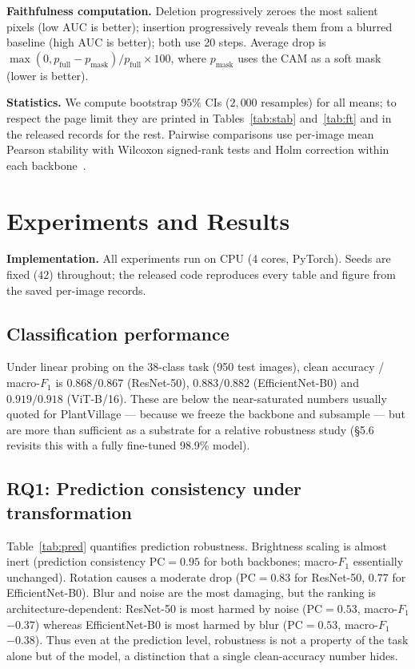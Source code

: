 \documentclass[runningheads]{llncs}
\begin{document}
\smallskip
\noindent\textbf{Faithfulness computation.} Deletion progressively zeroes the most
salient pixels (low AUC is better); insertion progressively reveals them from a
blurred baseline (high AUC is better); both use 20 steps. Average drop is
$\max(0, p_{\text{full}}-p_{\text{mask}})/p_{\text{full}}\times100$, where
$p_{\text{mask}}$ uses the CAM as a soft mask (lower is better).

\smallskip
\noindent\textbf{Statistics.} We compute bootstrap $95\%$ CIs ($2{,}000$ resamples)
for all means; to respect the page limit they are printed in Tables~\ref{tab:stab}
and~\ref{tab:ft} and in the released records for the rest. Pairwise comparisons use
per-image mean Pearson stability with Wilcoxon signed-rank tests and Holm correction
within each backbone~\cite{holm1979}.

\section{Experiments and Results}\label{sec:exp}
\noindent\textbf{Implementation.} All experiments run on CPU (4 cores, PyTorch).
Seeds are fixed ($42$) throughout; the released code reproduces every table and
figure from the saved per-image records.

\subsection{Classification performance}
Under linear probing on the 38-class task (950 test images), clean accuracy /
macro-$F_1$ is $0.868/0.867$ (ResNet-50), $0.883/0.882$ (EfficientNet-B0) and
$0.919/0.918$ (ViT-B/16). These are below the near-saturated numbers usually quoted
for PlantVillage --- because we freeze the backbone and subsample --- but are more
than sufficient as a substrate for a relative robustness study (\S5.6 revisits this
with a fully fine-tuned 98.9\% model).

\subsection{RQ1: Prediction consistency under transformation}
Table~\ref{tab:pred} quantifies prediction robustness.
Brightness scaling is almost inert (prediction consistency $\mathrm{PC}=0.95$ for
both backbones; macro-$F_1$ essentially unchanged). Rotation causes a moderate
drop ($\mathrm{PC}=0.83$ for ResNet-50, $0.77$ for EfficientNet-B0). Blur and
noise are the most damaging, but the ranking is architecture-dependent:
ResNet-50 is most harmed by noise ($\mathrm{PC}=0.53$, macro-$F_1$ $-0.37$)
whereas EfficientNet-B0 is most harmed by blur ($\mathrm{PC}=0.53$, macro-$F_1$
$-0.38$). Thus even at the prediction level, robustness is not a property of the
task alone but of the model, a distinction that a single clean-accuracy number
hides.
\end{document}
